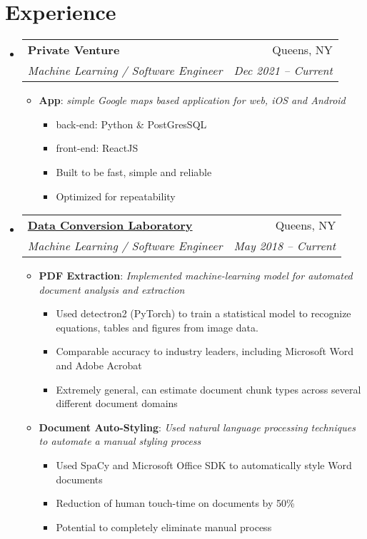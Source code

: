 \documentclass[a3paper]{article}
\makeatletter
\newcommand{\TwoRowSubheading}[4]{
	\item
		\begin{tabular*}{.95\textwidth}{l @{\extracolsep{\fill}} r}
			\textbf{#1} & #2 \\
			\textit{\small #3} & \textit{\small #4} \\
		\end{tabular*}\vspace{-1em}
}
\newcommand{\ListItem}[2]{
	\item \small \textbf{#1}{: \it #2}
}
\makeatother
\begin{document}
\section{Experience}
\begin{itemize}[label=\faUsers]
    
    \TwoRowSubheading
        {Private Venture}{Queens, NY}
        {Machine Learning / Software Engineer}{Dec 2021 -- Current}
    
    \begin{itemize}[label=\faGears]

		\ListItem{App}{simple Google maps based application for web, iOS and Android}
		\begin{itemize}[label=\faGear]
			\item back-end: Python \& PostGresSQL
			\item front-end: ReactJS
			\item Built to be fast, simple and reliable
			\item Optimized for repeatability
		\end{itemize}
    
    \end{itemize}

    \vspace{1em}

	\TwoRowSubheading
		{\href{http://www.dclab.com}{Data Conversion Laboratory}}{Queens, NY}
		{Machine Learning / Software Engineer}{May 2018 -- Current}
	
	\begin{itemize}[label=\faGears] 

		\ListItem{PDF Extraction}{Implemented machine-learning model for automated document analysis and extraction}
		\begin{itemize}[label=\faGear]
			\item Used detectron2 (PyTorch) to train a statistical model to recognize equations, tables and figures from image data.
			\item Comparable accuracy to industry leaders, including Microsoft Word and Adobe Acrobat
			\item Extremely general, can estimate document chunk types across several different document domains
		\end{itemize}

		\ListItem{Document Auto-Styling}{Used natural language processing techniques to automate a manual styling process}
		\begin{itemize}[label=\faGear]
			\item Used SpaCy and Microsoft Office SDK to automatically style Word documents
			\item Reduction of human touch-time on documents by 50\%
			\item Potential to completely eliminate manual process 
		\end{itemize}


\end{itemize}
\end{itemize}
\end{document}
